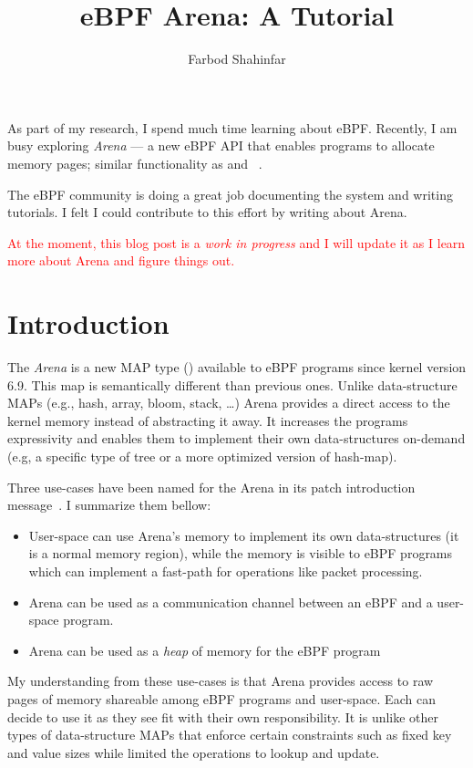 \documentclass{article}
\title{eBPF Arena: A Tutorial}
\author{Farbod Shahinfar}
\begin{document}
\maketitle



As part of my research, I spend much time learning about eBPF.
Recently, I am busy exploring \emph{Arena} --- a new eBPF API that enables
programs to allocate memory pages; similar functionality as  and
~\cite{arenapatch}.

The eBPF community is doing a great job documenting the system and writing
tutorials. I felt I could contribute to this effort by writing about Arena.

{
    \textcolor{red}{At the moment, this blog post is a \emph{work in
    progress} and I will update it as I learn more about Arena and figure
    things out.}
}

\section{Introduction}

The \emph{Arena} is a new MAP type () available to eBPF programs
since kernel version 6.9.
This map is semantically different than previous ones.
Unlike data-structure MAPs (e.g., hash, array, bloom, stack, \dots{}) Arena
provides a direct access to the kernel memory instead of abstracting it away.
It increases the programs expressivity and enables them to implement their own
data-structures on-demand (e.g, a specific type of tree or a more optimized
version of hash-map).

Three use-cases have been named for the Arena in its patch introduction
message~\cite{arenapatch}. I summarize them bellow:
\begin{itemize}
    \item User-space can use Arena's memory to implement its own
        data-structures (it is a normal memory region), while the memory is
        visible to eBPF programs which can implement a fast-path for operations
        like packet processing.
    \item Arena can be used as a communication channel between an eBPF and a
        user-space program.
    \item Arena can be used as a \emph{heap} of memory for the eBPF program
\end{itemize}
My understanding from these use-cases is that Arena provides access to raw
pages of memory shareable among eBPF programs and user-space. Each can decide to
use it as they see fit with their own responsibility. It is unlike other types
of data-structure MAPs that enforce certain constraints such as fixed key and
value sizes while limited the operations to lookup and update.
\end{document}
